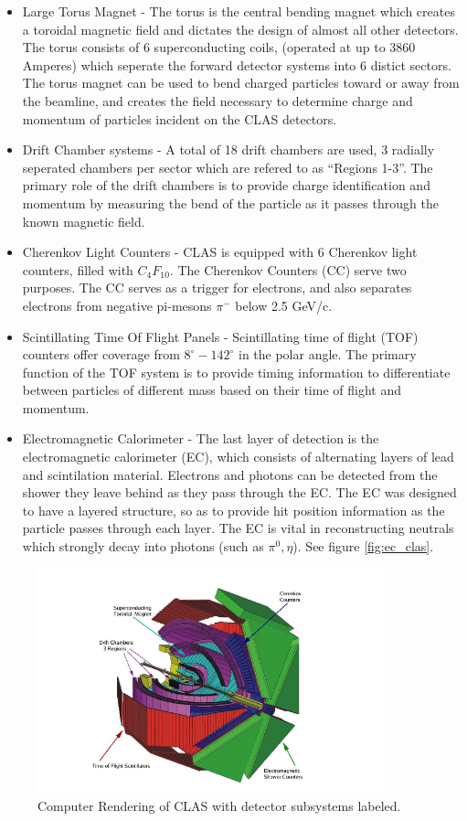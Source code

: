 \begin{itemize}
\item Large Torus Magnet - The torus is the central bending magnet which creates a toroidal magnetic field and dictates the design of almost all other detectors.  The torus consists of 6 superconducting coils, (operated at up to 3860 Amperes) which seperate the forward detector systems into 6 distict sectors.  The torus magnet can be used to bend charged particles toward or away from the beamline, and creates the field necessary to determine charge and momentum of particles incident on the CLAS detectors.  
\item Drift Chamber systems - A total of 18 drift chambers are used, 3 radially seperated chambers per sector which are refered to as ``Regions 1-3''.  The primary role of the drift chambers is to provide charge identification and momentum by measuring the bend of the particle as it passes through the known magnetic field.    
\item Cherenkov Light Counters - CLAS is equipped with 6 Cherenkov light counters, filled with $C_{4} F_{10}$.  The Cherenkov Counters (CC) serve two purposes.  The CC serves as a trigger for electrons, and also separates electrons from negative pi-mesons $\pi^{-}$ below 2.5 GeV/c.
\item Scintillating Time Of Flight Panels - Scintillating time of flight (TOF) counters offer coverage from $8^{\circ} - 142^{\circ}$ in the polar angle.  The primary function of the TOF system is to provide timing information to differentiate between particles of different mass based on their time of flight and momentum.  
\item Electromagnetic Calorimeter - The last layer of detection is the electromagnetic calorimeter (EC), which consists of alternating layers of lead and scintilation material.  Electrons and photons can be detected from the shower they leave behind as they pass through the EC.  The EC was designed to have a layered structure, so as to provide hit position information as the particle passes through each layer.  The EC is vital in reconstructing neutrals which strongly decay into photons (such as $\pi^0, \eta$). See figure \ref{fig:ec_clas}.  
\end{itemize}

\begin{figure}
  \centering
  \includegraphics[width=10cm]{image/clas.png}
  \caption{ Computer Rendering of CLAS with detector subsystems labeled.}
  \label{fig:clas}
\end{figure}

